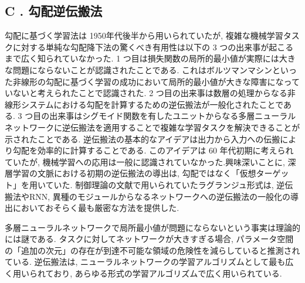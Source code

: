 \documentclass[twocolumn]{jarticle}     %
\begin{document}
\subsection*{C . 勾配逆伝搬法}
勾配に基づく学習法は 1950年代後半から用いられていたが, 複雑な機械学習タスクに対する単純な勾配降下法の驚くべき有用性は以下の 3 つの出来事が起こるまで広く知られていなかった.
 1 つ目は損失関数の局所的最小値が実際には大きな問題にならないことが認識されたことである. これはボルツマンマシンといった非線形の勾配に基づく学習の成功において局所的最小値が大きな障害になっていないと考えられたことで認識された.
 2 つ目の出来事は数層の処理からなる非線形システムにおける勾配を計算するための逆伝搬法が一般化されたことである. 3 つ目の出来事はシグモイド関数を有したユニットからなる多層ニューラルネットワークに逆伝搬法を適用することで複雑な学習タスクを解決できることが示されたことである.
 逆伝搬法の基本的なアイデアは出力から入力への伝搬により勾配を効率的に計算することである. このアイデアは 60 年代初期に考えられていたが, 機械学習への応用は一般に認識されていなかった.興味深いことに, 深層学習の文脈における初期の逆伝搬法の導出は, 勾配ではなく「仮想ターゲット」を用いていた.
 制御理論の文献で用いられていたラグランジュ形式は, 逆伝搬法やRNN, 異種のモジュールからなるネットワークへの逆伝搬法の一般化の導出においておそらく最も厳密な方法を提供した.
\par
多層ニューラルネットワークで局所最小値が問題にならないという事実は理論的には謎である. 
タスクに対してネットワークが大きすぎる場合, パラメータ空間の「追加の次元」の存在が到達不可能な領域の危険性を減らしていると推測されている.
逆伝搬法は, ニューラルネットワークの学習アルゴリズムとして最も広く用いられており, あらゆる形式の学習アルゴリズムで広く用いられている.
\end{document}
